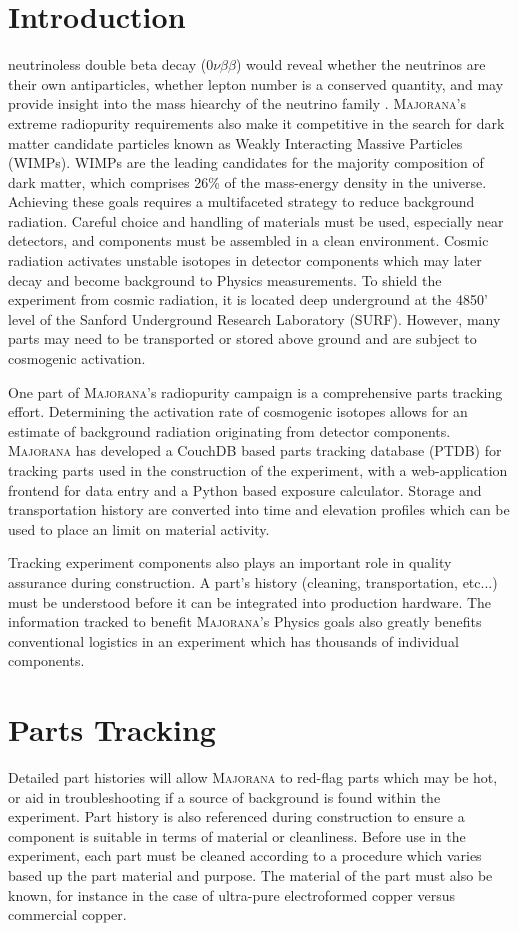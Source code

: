 \documentclass[journal]{IEEEtran}
\def\znbb{0$\nu\beta\beta$}
\begin{document}
\section{Introduction}
 neutrinoless double beta decay (\znbb) would reveal whether the neutrinos are their own antiparticles,
whether lepton number is a conserved quantity, and may provide insight into
the mass hiearchy of the neutrino family \cite{mj_wilkerson}.
\textsc{Majorana}'s extreme radiopurity requirements also make it competitive in the search for dark
matter candidate particles known as Weakly Interacting Massive Particles (WIMPs).
WIMPs are the leading candidates for the majority composition of dark matter,
which comprises \cite{darkmatter_bertone} 26\% of the mass-energy density in the universe.
Achieving these goals requires a multifaceted strategy to reduce background radiation.
Careful choice and handling of materials must be used,
especially near detectors, and components must be assembled in a clean environment.
Cosmic radiation activates unstable isotopes in detector components which may later decay and become background
to Physics measurements.
To shield the experiment from cosmic radiation, it is located deep underground
at the 4850' level of the Sanford Underground Research Laboratory (SURF).
However, many parts may need to be transported or stored above ground and are subject to
cosmogenic activation.

One part of \textsc{Majorana}'s radiopurity campaign is a comprehensive parts tracking effort.
Determining the activation rate of cosmogenic isotopes allows for an estimate of background
radiation originating from detector components. \textsc{Majorana} has developed a CouchDB  \cite{couchdb_guide} based 
parts tracking database (PTDB)
for tracking parts used in the construction of the experiment, with a web-application frontend
for data entry and a Python based exposure calculator. Storage and transportation history are
converted into time and elevation profiles which can be used to place an limit
on material activity.

Tracking experiment components also plays an important role in quality assurance during 
construction. A part's history (cleaning, transportation, etc...) must be 
understood before it can be integrated into production hardware. The information tracked
to benefit \textsc{Majorana}'s Physics goals also greatly benefits conventional logistics in an
experiment which has thousands of individual components.

\section{Parts Tracking}
Detailed part histories will allow \textsc{Majorana}
to red-flag parts which may be hot, or aid in troubleshooting if a source of background
is found within the experiment.
Part history is also referenced during construction to ensure a component is suitable in terms of material or cleanliness.
Before use in the experiment, each part must be cleaned according to a procedure which varies based up the part material and
purpose. The material of the part must also be known, for instance in the case of ultra-pure electroformed copper versus commercial
copper. 
\end{document}
